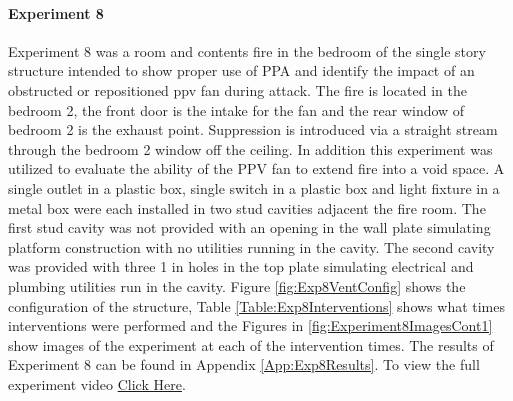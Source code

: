 \documentclass{article}
\begin{document}
\paragraph{Experiment 8}\mbox{}

Experiment 8 was a room and contents fire in the bedroom of the single story structure intended to show proper use of PPA and identify the impact of an obstructed or repositioned ppv fan during attack. The fire is located in the bedroom 2, the front door is the intake for the fan and the rear window of bedroom 2 is the exhaust point. Suppression is introduced via a straight stream through the bedroom 2 window off the ceiling. In addition this experiment was utilized to evaluate the ability of the PPV fan to extend fire into a void space. A single outlet in a plastic box, single switch in a plastic box and light fixture in a metal box were each installed in two stud cavities adjacent the fire room. The first stud cavity was not provided with an opening in the wall plate simulating platform construction with no utilities running in the cavity. The second cavity was provided with three 1 in holes in the top plate simulating electrical and plumbing utilities run in the cavity. Figure \ref{fig:Exp8VentConfig} shows the configuration of the structure, Table \ref{Table:Exp8Interventions} shows what times interventions were performed and the Figures in \ref{fig:Experiment8ImagesCont1} show images of the experiment at each of the intervention times. The results of Experiment 8 can be found in Appendix \ref{App:Exp8Results}. To view the full experiment video \href{https://youtu.be/OzkzBTcsMs0}{Click Here}.
\end{document}
